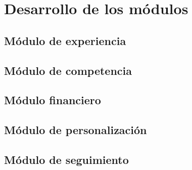
\chapter{Desarrollo de los módulos}\label{mod:concentrado}

    \section{Módulo de experiencia}\label{mod:exp}
    

    \section{Módulo de competencia}\label{mod:comp}
    


    \section{Módulo financiero}\label{mod:financ}
    

    \section{Módulo de personalización}\label{mod:pers}
    


    \section{Módulo de seguimiento}\label{mod:seguim}
    
